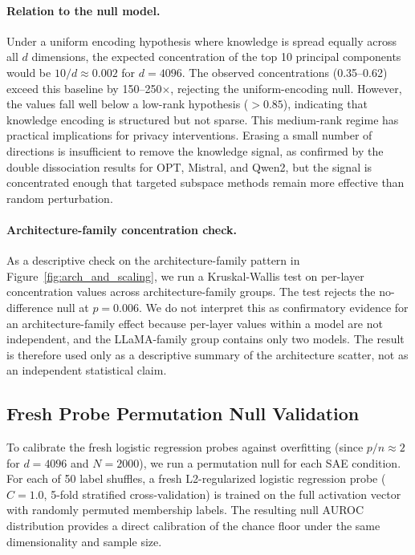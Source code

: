 \paragraph{Relation to the null model.}
Under a uniform encoding hypothesis where knowledge is spread equally across all $d$ dimensions, the expected concentration of the top 10 principal components would be $10/d \approx 0.002$ for $d = 4096$.
The observed concentrations (0.35--0.62) exceed this baseline by 150--250$\times$, rejecting the uniform-encoding null.
However, the values fall well below a low-rank hypothesis ($> 0.85$), indicating that knowledge encoding is structured but not sparse.
This medium-rank regime has practical implications for privacy interventions. Erasing a small number of directions is insufficient to remove the knowledge signal, as confirmed by the double dissociation results for OPT, Mistral, and Qwen2, but the signal is concentrated enough that targeted subspace methods remain more effective than random perturbation.

\paragraph{Architecture-family concentration check.}
As a descriptive check on the architecture-family pattern in Figure~\ref{fig:arch_and_scaling}, we run a Kruskal-Wallis test on per-layer concentration values across architecture-family groups. The test rejects the no-difference null at $p = 0.006$. We do not interpret this as confirmatory evidence for an architecture-family effect because per-layer values within a model are not independent, and the LLaMA-family group contains only two models. The result is therefore used only as a descriptive summary of the architecture scatter, not as an independent statistical claim.

\subsection{Fresh Probe Permutation Null Validation}
\label{app:fresh_probe_v2}

To calibrate the fresh logistic regression probes against overfitting (since $p/n \approx 2$ for $d = 4096$ and $N = 2000$), we run a permutation null for each SAE condition.
For each of 50 label shuffles, a fresh L2-regularized logistic regression probe ($C = 1.0$, 5-fold stratified cross-validation) is trained on the full activation vector with randomly permuted membership labels.
The resulting null AUROC distribution provides a direct calibration of the chance floor under the same dimensionality and sample size.

